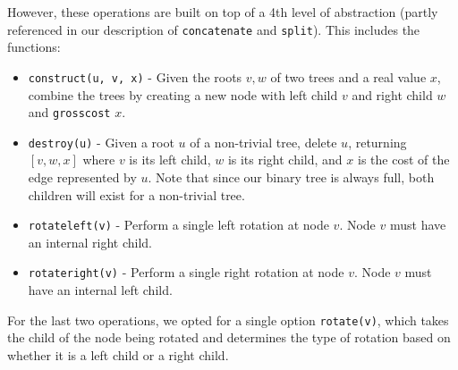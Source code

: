 \documentclass[a4paper, 11pt]{article}
\begin{document}
However, these operations are built on top of a 4th level of abstraction (partly referenced in our description of \texttt{concatenate} and \texttt{split}). This includes the functions:

\begin{itemize}
    \item \texttt{construct(u, v, x)} - Given the roots \(v, w\) of two trees and a real value \(x\), combine the trees by creating a new node with left child \(v\) and right child \(w\) and \texttt{grosscost} \(x\).
    \item \texttt{destroy(u)} - Given a root \(u\) of a non-trivial tree, delete \(u\), returning \([v, w, x]\) where \(v\) is its left child, \(w\) is its right child, and \(x\) is the cost of the edge represented by \(u\). Note that since our binary tree is always full, both children will exist for a non-trivial tree.
    \item \texttt{rotateleft(v)} - Perform a single left rotation at node \(v\). Node \(v\) must have an internal right child.
    \item \texttt{rotateright(v)} - Perform a single right rotation at node \(v\). Node \(v\) must have an internal left child.
\end{itemize}

For the last two operations, we opted for a single option \texttt{rotate(v)}, which takes the child of the node being rotated and determines the type of rotation based on whether it is a left child or a right child.
\end{document}
